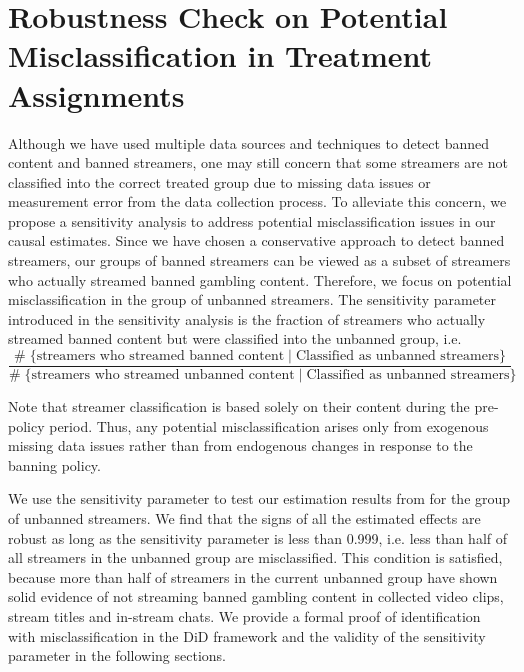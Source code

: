 \documentclass[a4paper,12pt]{article}
\begin{document}
\clearpage 
\newpage

\section{Robustness Check on Potential Misclassification in Treatment Assignments}\label{appendix_misclassification}

Although we have used multiple data sources and techniques to detect banned content and banned streamers, one may still concern that some streamers are not classified into the correct treated group due to missing data issues or measurement error from the data collection process. To alleviate this concern, we propose a sensitivity analysis to address potential misclassification issues in our causal estimates. Since we have chosen a conservative approach to detect banned streamers, our groups of banned streamers can be viewed as a subset of streamers who actually streamed banned gambling content. Therefore, we focus on potential misclassification in the group of unbanned streamers. The sensitivity parameter introduced in the sensitivity analysis is the fraction of streamers who actually streamed banned content but were classified into the unbanned group, i.e.
\begin{equation*}
    \frac{\#\; \{\text{streamers who streamed banned content} \mid \text{Classified as unbanned streamers}\}}{\#\; \{\text{streamers who streamed unbanned content} \mid \text{Classified as unbanned streamers}\}}
\end{equation*}

Note that streamer classification is based solely on their content during the pre-policy period. Thus, any potential misclassification arises only from exogenous missing data issues rather than from endogenous changes in response to the banning policy.

We use the sensitivity parameter to test our estimation results from  for the group of unbanned streamers. We find that the signs of all the estimated effects are robust as long as the sensitivity parameter is less than 0.999, i.e. less than half of all streamers in the unbanned group are misclassified. This condition is satisfied, because more than half of streamers in the current unbanned group have shown solid evidence of not streaming banned gambling content in collected video clips, stream titles and in-stream chats. We provide a formal proof of identification with misclassification in the DiD framework and the validity of the sensitivity parameter in the following sections.
\end{document}
